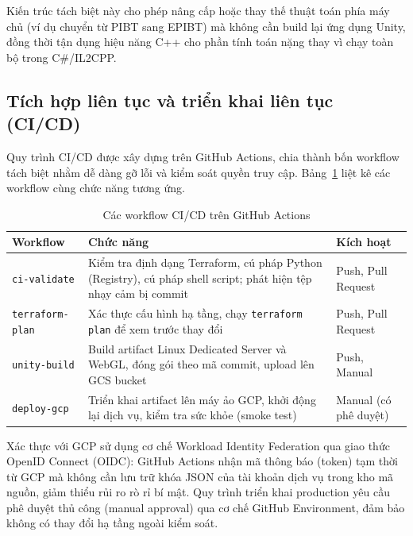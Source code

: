 \documentclass[../DoAn.tex]{subfiles}
\begin{document}
Kiến trúc tách biệt này cho phép nâng cấp hoặc thay thế thuật toán phía máy chủ (ví dụ
chuyển từ PIBT sang EPIBT) mà không cần build lại ứng dụng Unity, đồng thời tận dụng hiệu
năng C++ cho phần tính toán nặng thay vì chạy toàn bộ trong C\#/IL2CPP.

\subsection{Tích hợp liên tục và triển khai liên tục (CI/CD)}

Quy trình CI/CD được xây dựng trên GitHub Actions, chia thành bốn workflow tách biệt nhằm
dễ dàng gỡ lỗi và kiểm soát quyền truy cập. Bảng~\ref{tab:cicd_workflows} liệt kê các
workflow cùng chức năng tương ứng.

\begin{table}[htbp]
\centering
\caption{Các workflow CI/CD trên GitHub Actions}
\label{tab:cicd_workflows}
\small
\begin{tabular}{|l|p{4.8cm}|p{4.2cm}|}
\hline
\textbf{Workflow} & \textbf{Chức năng} & \textbf{Kích hoạt} \\ \hline
\texttt{ci-validate}    & Kiểm tra định dạng Terraform, cú pháp Python
                          (Registry), cú pháp shell script; phát hiện tệp
                          nhạy cảm bị commit & Push, Pull Request \\
\hline
\texttt{terraform-plan} & Xác thực cấu hình hạ tầng, chạy
                          \texttt{terraform plan} để xem trước thay đổi
                          & Push, Pull Request \\
\hline
\texttt{unity-build}    & Build artifact Linux Dedicated Server và WebGL,
                          đóng gói theo mã commit, upload lên GCS bucket
                          & Push, Manual \\
\hline
\texttt{deploy-gcp}     & Triển khai artifact lên máy ảo GCP, khởi động lại
                          dịch vụ, kiểm tra sức khỏe (smoke test)
                          & Manual (có phê duyệt) \\ \hline
\end{tabular}
\end{table}

Xác thực với GCP sử dụng cơ chế Workload Identity Federation qua giao thức OpenID Connect
(OIDC): GitHub Actions nhận mã thông báo (token) tạm thời từ GCP mà không cần lưu trữ khóa
JSON của tài khoản dịch vụ trong kho mã nguồn, giảm thiểu rủi ro rò rỉ bí mật. Quy trình
triển khai production yêu cầu phê duyệt thủ công (manual approval) qua cơ chế GitHub
Environment, đảm bảo không có thay đổi hạ tầng ngoài kiểm soát.
\end{document}
